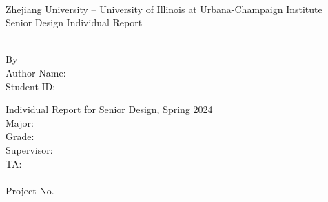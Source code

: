 \documentclass[../individual_thesis.tex]{subfiles}
\begin{document}
\begin{titlepage}
    \begin{center}
        ~~\\ %
        \vspace{1.5cm}
        {\fontsize{16}{24}\selectfont Zhejiang University -- University of Illinois at Urbana-Champaign Institute}\\
        \vspace{1.88cm}
        {\fontsize{28}{42}\selectfont Senior Design Individual Report}\\
        \vspace{1.6cm}
        \begin{minipage}{15.92cm}
            \centering
            \fontsize{26}{26}\selectfont
            \MakeUppercase{\bf \RPTTITLE}
        \end{minipage}\\[2cm]
        {\fontsize{14}{21}\selectfont By}\\[1.5em]
        {\fontsize{14}{21}\selectfont Author Name: \AUTHORNAME}\\
        {\fontsize{14}{21}\selectfont Student ID: \STUDENTID}

        \vfill
        {\fontsize{12}{\baselineskip}\selectfont Individual Report for Senior Design, Spring 2024\\
            Major: \MAJOR \\
            Grade: \GRADE \\
            Supervisor: \FACULTYNAME \\
            TA:~ \TANAME\\
            \vfill}
        {\fontsize{12}{18}\selectfont\RPTDATE\\
            Project No. \PROJNBR}
    \end{center}
    \vspace{2cm}
    ~
    \restoregeometry
\end{titlepage}
\thispagestyle{empty}
\end{document}
